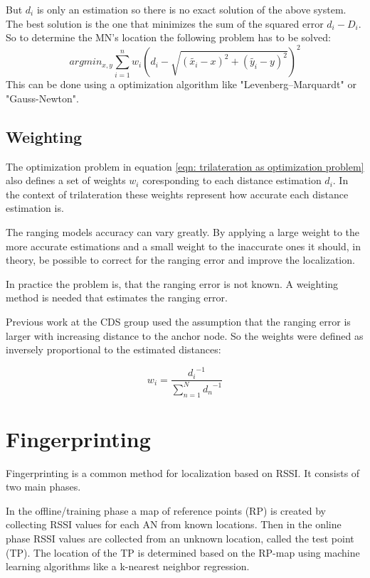 But \(d_{i}\) is only an estimation so there is no exact solution of the above system. The best solution is the one that minimizes the sum of the squared error \(d_{i} - D_{i}\). So to determine the MN's location the following problem has to be solved:
\begin{equation}
argmin_{x,y}\sum_{i=1}^{n}w_{i}\left ( d_{i} - \sqrt{\left ( \tilde{x_{i}}-x \right )^{2}+\left ( \tilde{y_{i}}-y \right )^{2}} \right )^{2}
\label{eqn: trilateration as optimization problem}
\end{equation}
This can be done using a optimization algorithm like "Levenberg–Marquardt" or "Gauss-Newton".

\subsection{Weighting}

The optimization problem in equation \ref{eqn: trilateration as optimization problem} also defines a set of weights $w_i$ coresponding to each distance estimation $d_i$. In the context of trilateration these weights represent how accurate each distance estimation is.

The ranging models accuracy can vary greatly. By applying a large weight to the more accurate estimations and a small weight to the inaccurate ones it should, in theory, be possible to correct for the ranging error and improve the localization.

In practice the problem is, that the ranging error is not known. A weighting method is needed that estimates the ranging error.

Previous work at the CDS group \cite{FineGrainedIndoorTracking} used the assumption that the ranging error is larger with increasing distance to the anchor node. So the weights were defined as inversely proportional to the estimated distances:

\begin{equation}
w_{i}=\frac{{d_i}^{-1}}{\sum_{n=1}^{N}{d_n}^{-1}}
\label{eqn: distance weights}
\end{equation}

\section{Fingerprinting}

Fingerprinting is a common method for localization based on RSSI\cite{chapre2013RSSI}. It consists of two main phases.

In the offline/training phase a map of reference points (RP) is created by collecting RSSI values for each AN from known locations.
Then in the online phase RSSI values are collected from an unknown location, called the test point (TP). The location of the TP is determined based on the RP-map using machine learning algorithms like  a k-nearest neighbor regression\cite{JoseMaster}.


